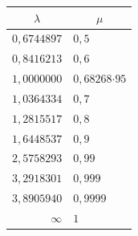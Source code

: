 \begin{center}
\begin{tabular}{r|l}
\multicolumn{1}{c|}{\(\lambda\)}&\multicolumn{1}{c}{\(\mu\)}\\\hline
\(0{,}6744897\)&\(0{,}5\)\\
\(0{,}8416213\)&\(0{,}6\)\\
\(1{,}0000000\)&\(0{,}68268\mathord{\cdot}95\)\\
\(1{,}0364334\)&\(0{,}7\)\\
\(1{,}2815517\)&\(0{,}8\)\\
\(1{,}6448537\)&\(0{,}9\)\\
\(2{,}5758293\)&\(0{,}99\)\\
\(3{,}2918301\)&\(0{,}999\)\\
\(3{,}8905940\)&\(0{,}9999\)\\
\(\infty\)&\(1\)
\end{tabular}
\end{center}

\clearpage
